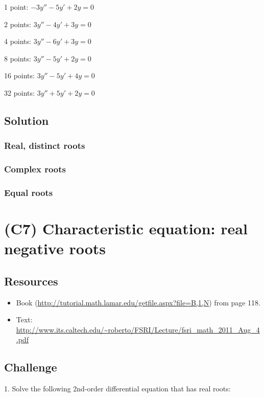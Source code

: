 1 point: $\displaystyle -3 y'' - 5 y' + 2 y = 0$ %

2 points: $\displaystyle 3 y'' - 4 y' + 3 y = 0$ %

4 points: $\displaystyle 3 y'' - 6 y' + 3 y = 0$ %

8 points: $\displaystyle 3 y'' - 5 y' + 2 y = 0$ %

16 points: $\displaystyle 3 y'' - 5 y' + 4 y = 0$ %

32 points: $\displaystyle 3 y'' + 5 y' + 2 y = 0$ %

\subsection*{Solution}

\subsubsection*{Real, distinct roots}

\subsubsection*{Complex roots}

\subsubsection{Equal roots}




\newpage
\section{(C7) Characteristic equation: real negative roots}

\subsection*{Resources}
\begin{itemize}
    \item Book (\url{http://tutorial.math.lamar.edu/getfile.aspx?file=B,1,N}) from page 118.
    \item Text: \url{http://www.its.caltech.edu/~roberto/FSRI/Lecture/fsri_math_2011_Aug_4.pdf}
\end{itemize}

\subsection*{Challenge}
1. Solve the following 2nd-order differential equation that has real roots:

